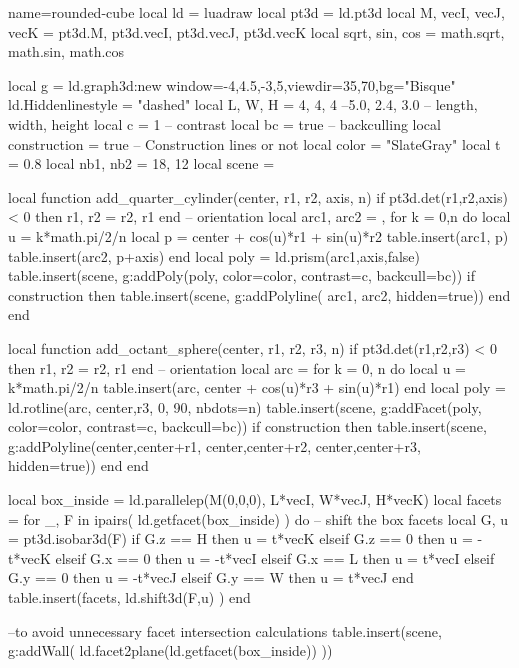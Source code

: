 \documentclass[border=5pt]{standalone}%
\begin{document}
\begin{luadraw}{name=rounded-cube}
local ld = luadraw
local pt3d = ld.pt3d
local M, vecI, vecJ, vecK = pt3d.M, pt3d.vecI, pt3d.vecJ, pt3d.vecK
local sqrt, sin, cos = math.sqrt, math.sin, math.cos

local g = ld.graph3d:new{ window={-4,4.5,-3,5},viewdir={35,70},bg="Bisque" }
ld.Hiddenlinestyle = "dashed"
local L, W, H = 4, 4, 4 --5.0, 2.4, 3.0 -- length, width, height
local c = 1 -- contrast
local bc = true -- backculling
local construction = true -- Construction lines or not
local color = "SlateGray"
local t = 0.8
local nb1, nb2 = 18, 12
local scene = {}

local function add_quarter_cylinder(center, r1, r2, axis, n)
  if pt3d.det(r1,r2,axis) < 0 then r1, r2 = r2, r1 end -- orientation
  local arc1, arc2 = {}, {}
  for k = 0,n do
    local u = k*math.pi/2/n
    local p = center + cos(u)*r1 + sin(u)*r2
    table.insert(arc1, p)
    table.insert(arc2, p+axis)
  end
  local poly = ld.prism(arc1,axis,false)
  table.insert(scene, g:addPoly(poly, {color=color, contrast=c, backcull=bc}))
  if construction then
    table.insert(scene, g:addPolyline( {arc1, arc2}, {hidden=true}))
  end
end

local function add_octant_sphere(center, r1, r2, r3, n)
    if pt3d.det(r1,r2,r3) < 0 then r1, r2 = r2, r1 end -- orientation
    local arc = {}
    for k = 0, n do
        local u = k*math.pi/2/n
        table.insert(arc, center + cos(u)*r3 + sin(u)*r1)
    end
    local poly = ld.rotline(arc, {center,r3}, 0, 90, {nbdots=n})
    table.insert(scene, g:addFacet(poly, {color=color, contrast=c, backcull=bc}))
    if construction then
        table.insert(scene, g:addPolyline({{center,center+r1}, {center,center+r2}, 
            {center,center+r3}}, {hidden=true}))
    end
end

local box_inside = ld.parallelep(M(0,0,0), L*vecI, W*vecJ, H*vecK)
local facets = {}
for _, F in ipairs( ld.getfacet(box_inside) ) do -- shift the box facets
    local G, u = pt3d.isobar3d(F)
    if G.z == H then u = t*vecK
    elseif G.z == 0 then u = -t*vecK
    elseif G.x == 0 then u = -t*vecI
    elseif G.x == L then u = t*vecI
    elseif G.y == 0 then u = -t*vecJ
    elseif G.y == W then u = t*vecJ
    end
    table.insert(facets, ld.shift3d(F,u) )
end

--to avoid unnecessary facet intersection calculations
table.insert(scene, g:addWall( ld.facet2plane(ld.getfacet(box_inside)) ))


\end{luadraw}
\end{document}

